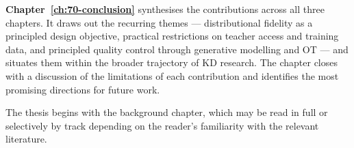 \begin{foldable}
  \textbf{Chapter~\ref{ch:70-conclusion}} synthesises the contributions across all three chapters.
  It draws out the recurring themes — distributional fidelity as a principled design objective, practical restrictions on teacher access and training data, and principled quality control through generative modelling and \ac{OT} — and situates them within the broader trajectory of \ac{KD} research.
  The chapter closes with a discussion of the limitations of each contribution and identifies the most promising directions for future work.
\end{foldable}

\begin{foldable}
  The thesis begins with the background chapter, which may be read in full or selectively by track depending on the reader's familiarity with the relevant literature.
\end{foldable}
